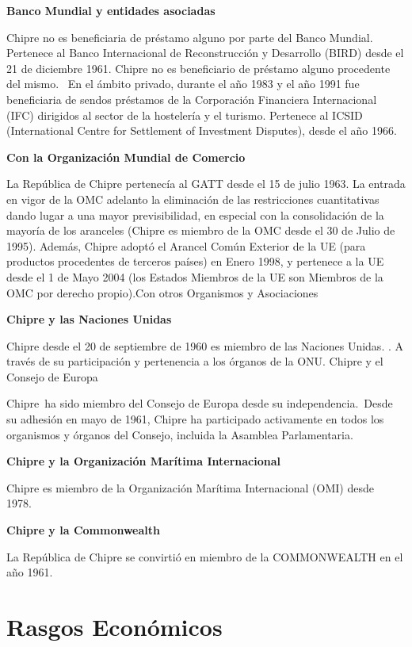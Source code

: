 \documentclass[a4paper,openright,12pt]{book}
\begin{document}
\textbf{Banco Mundial y entidades asociadas}

Chipre no es beneficiaria de préstamo alguno por parte del Banco Mundial.
 Pertenece al Banco Internacional de Reconstrucción y Desarrollo (BIRD) desde el 21 de diciembre 1961. Chipre no es beneficiario de préstamo alguno procedente del mismo. 
En el ámbito privado, durante el año 1983 y el año 1991 fue beneficiaria de sendos préstamos de la Corporación Financiera Internacional (IFC) dirigidos al sector de la hostelería y el turismo.
Pertenece al ICSID (International Centre for Settlement of Investment Disputes), desde el año 1966.

\textbf{Con la Organización Mundial de Comercio}

La República de Chipre pertenecía al GATT desde el 15 de julio 1963. La entrada en vigor de la OMC adelanto  la eliminación de las restricciones cuantitativas  dando lugar a una mayor previsibilidad,  en especial con la consolidación de la mayoría de los aranceles (Chipre es miembro de la OMC desde el 30 de Julio de 1995). Además, Chipre adoptó el Arancel Común Exterior de la UE (para productos procedentes de terceros países) en Enero 1998, y pertenece a la UE desde el 1 de Mayo 2004 (los Estados Miembros de la UE son Miembros de la OMC por derecho propio).Con otros Organismos y Asociaciones

\textbf{Chipre y las Naciones Unidas}


Chipre desde el 20 de septiembre de 1960 es miembro de las Naciones Unidas. . A través de su participación y pertenencia a los órganos de la ONU. Chipre y el Consejo de Europa

Chipre ha sido miembro del Consejo de Europa desde su independencia. Desde su adhesión en mayo de 1961, Chipre ha participado activamente en todos los organismos y órganos del Consejo, incluida la Asamblea Parlamentaria. 

\textbf{Chipre y la Organización Marítima Internacional}

Chipre es miembro de la Organización Marítima Internacional (OMI) desde 1978. 

\textbf{Chipre y la Commonwealth}


La República de Chipre se convirtió en miembro de la COMMONWEALTH en el año 1961.

\section{Rasgos Económicos}
\end{document}

